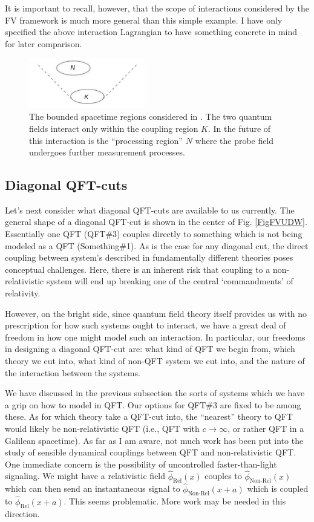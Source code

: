 \documentclass[12pt,prd,superscriptaddress,floatfix,amsmath,amssymb,amsfonts,nofootinbib]{revtex4-2}
\begin{document}
It is important to recall, however, that the scope of interactions considered by the FV framework is much more general than this simple example. I have only specified the above interaction Lagrangian to have something concrete in mind for later comparison.

\begin{figure}
\includegraphics[width=0.45\textwidth]{Figures/FVframework.pdf}
\caption{The bounded spacetime regions considered in \cite{Ruep2021}. The two quantum fields interact only within the coupling region $K$. In the future of this interaction is the ``processing region'' $N$ where the probe field undergoes further measurement processes.}\label{FigFV}
\end{figure}

\subsection{Diagonal QFT-cuts}
Let's next consider what diagonal QFT-cuts are available to us currently. The general shape of a diagonal QFT-cut is shown in the center of Fig. \ref{FigFVUDW}. Essentially one QFT (QFT\#3) couples directly to something which is not being modeled as a QFT (Something\#1). As is the case for any diagonal cut, the direct coupling between system's described in fundamentally different theories poses conceptual challenges. Here, there is an inherent risk that coupling to a non-relativistic system will end up breaking one of the central `commandments' of relativity. 

However, on the bright side, since quantum field theory itself provides us with no prescription for how such systems ought to interact, we have a great deal of freedom in how one might model such an interaction. In particular, our freedoms in designing a diagonal QFT-cut are: what kind of QFT we begin from, which theory we cut into, what kind of non-QFT system we cut into, and the nature of the interaction between the systems.

We have discussed in the previous subsection the sorts of systems which we have a grip on how to model in QFT. Our options for QFT\#3 are fixed to be among these. As for which theory take a QFT-cut into, the ``nearest'' theory to QFT would likely be non-relativistic QFT (i.e., QFT with $c\to\infty$, or rather QFT in a Galilean spacetime). As far as I am aware, not much work has been put into the study of sensible dynamical couplings between QFT and non-relativistic QFT. One immediate concern is the possibility of uncontrolled faster-than-light signaling. We might have a relativistic field $\hat\phi_\text{Rel}(x)$ couples to  $\hat\phi_\text{Non-Rel}(x)$ which can then send an instantaneous signal to $\hat\phi_\text{Non-Rel}(x+a)$ which is coupled to $\hat\phi_\text{Rel}(x+a)$. This seems problematic. More work may be needed in this direction.
\end{document}
